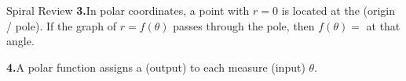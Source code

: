 \documentclass[10pt]{article}
\begin{document}
\begin{notesbox}{Spiral Review}
\vspace{0.14in}
\textbf{3.}\quad In polar coordinates, a point with $r = 0$ is located at the
\underline{\hspace{3cm}} (origin / pole). If the graph of $r = f(\theta)$ passes
through the pole, then $f(\theta) = $ \blank{1cm} at that angle.

\vspace{0.14in}
\textbf{4.}\quad A polar function assigns a \underline{\hspace{3cm}} (output) to each
\underline{\hspace{3cm}} measure (input) $\theta$.

\end{notesbox}
\end{document}

